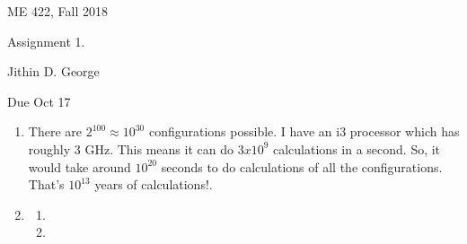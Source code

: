 \documentclass[letterpaper,12pt]{article}
\begin{document}




\noindent
{\scriptsize ME 422, Fall 2018} \hfill

\begin{center}
\large
Assignment 1.
\normalsize

Jithin D. George
\end{center}

\noindent
Due Oct 17
\vspace{.3in}




\noindent


\begin{enumerate}
\item

There are $2^{100} \approx 10^{30}$ configurations possible. I have an i3 processor which has roughly 3 GHz. This means it can do $3x10^9$ calculations in a second. So, it would take around $10^{20}$ seconds to do calculations of all the configurations. That's $10^{13}$ years of calculations!.

\item

\begin{enumerate}
\item


\item


\end{enumerate}
\end{enumerate}
\end{document}
